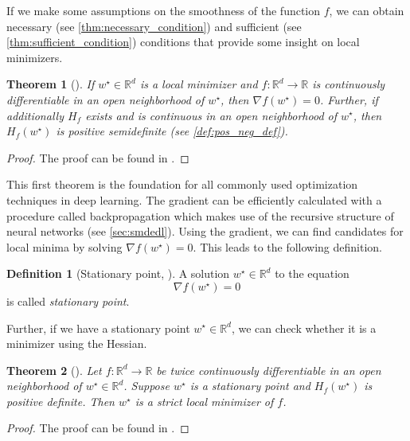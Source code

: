 \documentclass[12pt]{article}
\newtheorem{theorem}{Theorem}[section]
\theoremstyle{definition}
\newtheorem{definition}[definition]{Definition}
\numberwithin{equation}{section}
\newcommand{\R}{\mathbb{R}}
\begin{document}
If we make some assumptions on the smoothness of the function $f$, we can obtain necessary (see \autoref{thm:necessary_condition}) and sufficient (see \autoref{thm:sufficient_condition}) conditions that provide some insight on local minimizers.
\begin{theorem}[]
  \label{thm:necessary_condition}
  If $w^\star \in \R^d$ is a local minimizer and $f:\R^d \rightarrow \R$ is continuously differentiable in an open neighborhood of $w^\star$, then $\nabla f(w^\star) = 0$. Further, if additionally $H_f$ exists and is continuous in an open neighborhood of $w^\star$, then $H_f(w^\star)$ is positive semidefinite (see \autoref{def:pos_neg_def}).
\end{theorem}
\begin{proof}
  The proof can be found in \autocite{nocedalNumericalOptimization2006}.
\end{proof}
This first theorem is the foundation for all commonly used optimization techniques in deep learning. The gradient can be  efficiently calculated with a procedure called backpropagation which makes use of the recursive structure of neural networks (see \autoref{sec:smdedl}). 
Using the gradient, we can find candidates for local minima by solving $\nabla f(w^\star) = 0$. This leads to the following definition.
\begin{definition}[Stationary point, ]
  A solution $w^\star \in \R^d$ to the equation
  \begin{equation}
  \label{eq:StationaryPoint}
    \nabla f(w^\star) = 0
  \end{equation}
  is called \emph{stationary point}.
\end{definition}
Further, if we have a stationary point $w^\star \in \R^d$, we can check whether it is a minimizer using the Hessian.
\begin{theorem}[]
  \label{thm:sufficient_condition}
  Let $f:\R^d \rightarrow \R$ be twice continuously differentiable in an open neighborhood of $w^\star \in \R^d$. Suppose $w^\star$ is a stationary point and $H_f(w^\star)$ is positive definite. Then $w^\star$ is a strict local minimizer of $f$.
\end{theorem}
\begin{proof}
  The proof can be found in \cite[pp.~16]{nocedalNumericalOptimization2006}.
\end{proof}
\end{document}
